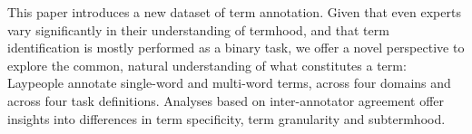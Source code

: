 This paper introduces a new dataset of term annotation. Given that even experts vary significantly in their understanding of termhood, and that term identification is mostly performed as a binary task, we offer a novel perspective to explore the common, natural understanding of what constitutes a term: Laypeople annotate single-word and multi-word terms, across four domains and across four task definitions. Analyses based on inter-annotator agreement offer insights into differences in term specificity, term granularity and subtermhood.
